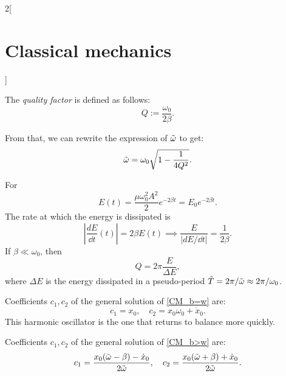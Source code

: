 \documentclass[../../../main.tex]{subfiles}
\begin{document}
\begin{multicols}{2}[\section{Classical mechanics}]
\begin{definition}
    The \textit{quality factor} is defined as follows: $$Q:=\frac{\omega_0}{2\beta}.$$
  \end{definition}
  \noindent From that, we can rewrite the expression of $\Tilde{\omega}$ to get: $$\Tilde{\omega}=\omega_0\sqrt{1-\frac{1}{4Q^2}}.$$
  \begin{prop}
    For
    $$E(t)=\frac{\mu\omega_0^2A^2}{2}e^{-2\beta t}=E_0e^{-2\beta t}.$$ The rate at which the energy is dissipated is $$\left|\frac{dE}{\dd t}(t)\right|=2\beta E(t)\implies\frac{E}{\left|dE/\dd t\right|}=\frac{1}{2\beta}.$$
    If $\beta\ll\omega_0$, then $$Q=2\pi\frac{E}{\Delta E},$$ where $\Delta E$ is the energy dissipated in a pseudo-period $\Tilde{T}=2\pi/\Tilde{\omega}\approx2\pi/\omega_0$.
  \end{prop}
  \begin{prop}[Critically damped harmonic oscillator: $\beta=\omega_0$]
    Coefficients $c_1,c_2$ of the general solution of \cref{CM_b=w} are: $$c_1=x_0,\quad c_2=x_0\omega_0+\dot{x}_0.$$ This harmonic oscillator is the one that returns to balance more quickly.
  \end{prop}
  \begin{prop}
    Coefficients $c_1,c_2$ of the general solution of \cref{CM_b>w} are: $$c_1=\frac{x_0(\Tilde{\omega}-\beta)-\dot{x}_0}{2\Tilde{\omega}},\quad c_2=\frac{x_0(\Tilde{\omega}+\beta)+\dot{x}_0}{2\Tilde{\omega}}.$$
  \end{prop}

\end{multicols}
\end{document}
